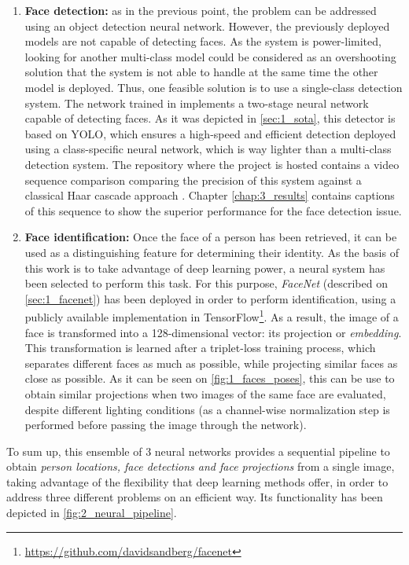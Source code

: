 \begin{enumerate}
	\item \textbf{Face detection:} as in the previous point, the problem can be addressed using an object detection neural network. However, the previously deployed models are not capable of detecting faces. As the system is power-limited, looking for another multi-class model could be considered as an overshooting solution that the system is not able to handle at the same time the other model is deployed. Thus, one feasible solution is to use a single-class detection system. The network trained in \cite{faced} implements a two-stage neural network capable of detecting faces. As it was depicted in \autoref{sec:1_sota}, this detector is based on YOLO, which ensures a high-speed and efficient detection deployed using a class-specific neural network, which is way lighter than a multi-class detection system. The repository where the project is hosted contains a video sequence comparison comparing the precision of this system against a classical Haar cascade approach \cite{violajones}.  Chapter \ref{chap:3_results} contains captions of this sequence to show the superior performance for the face detection issue.
	
	\item \textbf{Face identification:} Once the face of a person has been retrieved, it can be used as a distinguishing feature for determining their identity. As the basis of this work is to take advantage of deep learning power, a neural system has been selected to perform this task. For this purpose, \textit{FaceNet} (described on \autoref{sec:1_facenet}) has been deployed in order to perform identification, using a publicly available implementation in TensorFlow\footnote{\url{https://github.com/davidsandberg/facenet}}. As a result, the image of a face is transformed into a 128-dimensional vector: its projection or \textit{embedding}. This transformation is learned after a triplet-loss training process, which separates different faces as much as possible, while projecting similar faces as close as possible. As it can be seen on \autoref{fig:1_faces_poses}, this can be use to obtain similar projections when two images of the same face are evaluated, despite different lighting conditions (as a channel-wise normalization step is performed before passing the image through the network).
	
\end{enumerate}

To sum up, this ensemble of 3 neural networks provides a sequential pipeline to obtain \textit{person locations, face detections and face projections} from a single image, taking advantage of the flexibility that deep learning methods offer, in order to address three different problems on an efficient way. Its functionality has been depicted in \autoref{fig:2_neural_pipeline}.\\


